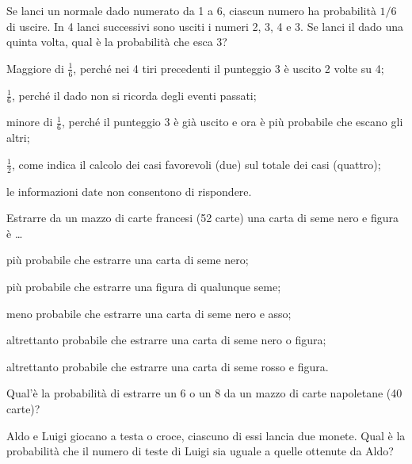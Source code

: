 \begin{esercizio}[2003~\Ast]
\label{ese:9.84}
 Se lanci un normale dado numerato da 1 a 6, ciascun numero ha probabilità $1/6$ di uscire. In 4 lanci successivi sono usciti i numeri 2, 3, 4 e 3. Se lanci il dado una quinta volta, qual è la probabilità che esca 3?
\begin{enumeratea}
\item Maggiore di $\frac{1}{6}$, perché nei 4 tiri precedenti il punteggio 3 è uscito 2 volte su 4;
\item $\frac{1}{6}$, perché il dado non si ricorda degli eventi passati;
\item minore di $\frac{1}{6}$, perché il punteggio 3 è già uscito e ora è più probabile che escano gli altri;
\item $\frac{1}{2}$, come indica il calcolo dei casi favorevoli (due) sul totale dei casi (quattro);
\item le informazioni date non consentono di rispondere.
\end{enumeratea}
\end{esercizio}

\begin{esercizio} [2003~\Ast]
\label{ese:9.85}
 Estrarre da un mazzo di carte francesi (52 carte) una carta di seme nero e figura è \ldots
\begin{enumeratea}
\item più probabile che estrarre una carta di seme nero;
\item più probabile che estrarre una figura di qualunque seme;
\item meno probabile che estrarre una carta di seme nero e asso;
\item altrettanto probabile che estrarre una carta di seme nero o figura;
\item altrettanto probabile che estrarre una carta di seme rosso e figura.
\end{enumeratea}
\end{esercizio}

\begin{esercizio}[2003~\Ast]
\label{ese:9.86}
Qual'è la probabilità di estrarre un 6 o un 8 da un mazzo di carte napoletane (40 carte)?
\end{esercizio}

\begin{esercizio}[2003~\Ast]
\label{ese:9.87}
Aldo e Luigi giocano a testa o croce, ciascuno di essi lancia due monete. Qual è la probabilità che il numero di teste di Luigi sia uguale a quelle ottenute da Aldo?
\end{esercizio}

